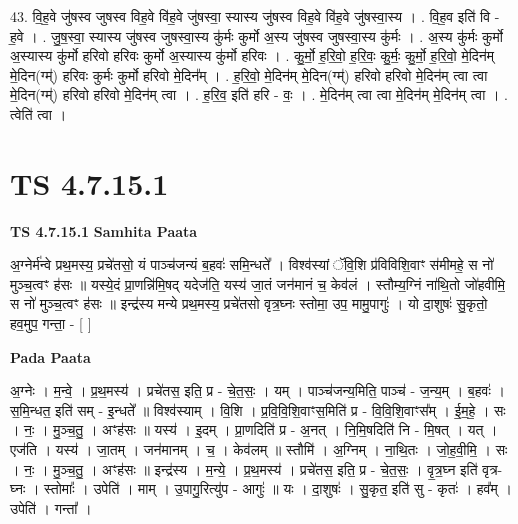 \documentclass[17pt]{extarticle}
\begin{document}
43. वि॒ह॒वे जु॑षस्व जुषस्व विह॒वे वि॑ह॒वे जु॑षस्वा॒ स्यास्य जु॑षस्व विह॒वे वि॑ह॒वे जु॑षस्वा॒स्य । . वि॒ह॒व इति॑ वि - ह॒वे । . जु॒ष॒स्वा॒ स्यास्य जु॑षस्व जुषस्वा॒स्य कु॑र्मः कुर्मो अ॒स्य जु॑षस्व जुषस्वा॒स्य कु॑र्मः । . अ॒स्य कु॑र्मः कुर्मो अ॒स्यास्य कु॑र्मो हरिवो हरिवः कुर्मो अ॒स्यास्य कु॑र्मो हरिवः । . कु॒र्मो॒ ह॒रि॒वो॒ ह॒रि॒वः॒ कु॒र्मः॒ कु॒र्मो॒ ह॒रि॒वो॒ मे॒दिन॑म् मे॒दिन(ग्म्॑) हरिवः कुर्मः कुर्मो हरिवो मे॒दिन᳚म् । . ह॒रि॒वो॒ मे॒दिन॑म् मे॒दिन(ग्म्॑) हरिवो हरिवो मे॒दिन॑म् त्वा त्वा मे॒दिन(ग्म्॑) हरिवो हरिवो मे॒दिन॑म् त्वा । . ह॒रि॒व॒ इति॑ हरि - वः॒ । . मे॒दिन॑म् त्वा त्वा मे॒दिन॑म् मे॒दिन॑म् त्वा । . त्वेति॑ त्वा । \newline
\pagebreak
{}

\section{ TS 4.7.15.1 }

\textbf{TS 4.7.15.1 } \newline
\textbf{Samhita Paata} \newline

अ॒ग्नेर्म॑न्वे प्रथ॒मस्य॒ प्रचे॑तसो॒ यं पाञ्च॑जन्यं ब॒हवः॑ समि॒न्धते᳚ । विश्व॑स्यां ॅवि॒शि प्र॑विविशि॒वाꣳ स॑मीमहे॒ स नो॑ मुञ्च॒त्वꣳ ह॑सः ॥ यस्ये॒दं प्रा॒णन्नि॑मि॒षद् यदेज॑ति॒ यस्य॑ जा॒तं जन॑मानं च॒ केव॑लं । स्तौम्य॒ग्निं ना॑थि॒तो जो॑हवीमि॒ स नो॑ मुञ्च॒त्वꣳ ह॑सः ॥ इन्द्र॑स्य मन्ये प्रथ॒मस्य॒ प्रचे॑तसो वृत्र॒घ्नः स्तोमा॒ उप॒ मामु॒पागुः॑ । यो दा॒शुषः॑ सु॒कृतो॒ हव॒मुप॒ गन्ता॒ - [  ] \newline

\textbf{Pada Paata} \newline

अ॒ग्नेः । म॒न्वे॒ । प्र॒थ॒मस्य॑ । प्रचे॑तस॒ इति॒ प्र - चे॒त॒सः॒ । यम् । पाञ्च॑जन्य॒मिति॒ पाञ्च॑ - ज॒न्य॒म् । ब॒हवः॑ । स॒मि॒न्धत॒ इति॑ सम् - इ॒न्धते᳚ ॥ विश्व॑स्याम् । वि॒शि । प्र॒वि॒वि॒शि॒वाꣳस॒मिति॑ प्र - वि॒वि॒शि॒वाꣳस᳚म् । ई॒म॒हे॒ । सः । नः॒ । मु॒ञ्च॒तु॒ । अꣳह॑सः ॥ यस्य॑ । इ॒दम् । प्रा॒णदिति॑ प्र - अ॒नत् । नि॒मि॒षदिति॑ नि - मि॒षत् । यत् । एज॑ति । यस्य॑ । जा॒तम् । जन॑मानम् । च॒ । केव॑लम् ॥ स्तौमि॑ । अ॒ग्निम् । ना॒थि॒तः । जो॒ह॒वी॒मि॒ । सः । नः॒ । मु॒ञ्च॒तु॒ । अꣳह॑सः ॥ इन्द्र॑स्य । म॒न्ये॒ । प्र॒थ॒मस्य॑ । प्रचे॑तस॒ इति॒ प्र - चे॒त॒सः॒ । वृ॒त्र॒घ्न इति॑ वृत्र-घ्नः । स्तोमाः᳚ । उपेति॑ । माम् । उ॒पागु॒रित्यु॑प - आगुः॑ ॥ यः । दा॒शुषः॑ । सु॒कृत॒ इति॑ सु - कृतः॑ । हव᳚म् । उपेति॑ । गन्ता᳚ ।  \newline
\end{document}
